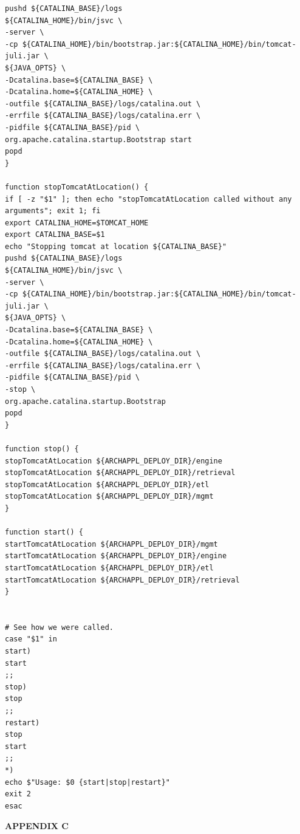 \documentclass[11pt
  , a4paper
  , article
  , oneside
]{memoir}
\begin{document}
\begin{lstlisting}[style=termstyle]
pushd ${CATALINA_BASE}/logs
${CATALINA_HOME}/bin/jsvc \
-server \
-cp ${CATALINA_HOME}/bin/bootstrap.jar:${CATALINA_HOME}/bin/tomcat-juli.jar \
${JAVA_OPTS} \
-Dcatalina.base=${CATALINA_BASE} \
-Dcatalina.home=${CATALINA_HOME} \
-outfile ${CATALINA_BASE}/logs/catalina.out \
-errfile ${CATALINA_BASE}/logs/catalina.err \
-pidfile ${CATALINA_BASE}/pid \
org.apache.catalina.startup.Bootstrap start
popd
}

function stopTomcatAtLocation() { 
if [ -z "$1" ]; then echo "stopTomcatAtLocation called without any arguments"; exit 1; fi
export CATALINA_HOME=$TOMCAT_HOME
export CATALINA_BASE=$1
echo "Stopping tomcat at location ${CATALINA_BASE}"
pushd ${CATALINA_BASE}/logs
${CATALINA_HOME}/bin/jsvc \
-server \
-cp ${CATALINA_HOME}/bin/bootstrap.jar:${CATALINA_HOME}/bin/tomcat-juli.jar \
${JAVA_OPTS} \
-Dcatalina.base=${CATALINA_BASE} \
-Dcatalina.home=${CATALINA_HOME} \
-outfile ${CATALINA_BASE}/logs/catalina.out \
-errfile ${CATALINA_BASE}/logs/catalina.err \
-pidfile ${CATALINA_BASE}/pid \
-stop \
org.apache.catalina.startup.Bootstrap 
popd
}

function stop() { 
stopTomcatAtLocation ${ARCHAPPL_DEPLOY_DIR}/engine
stopTomcatAtLocation ${ARCHAPPL_DEPLOY_DIR}/retrieval
stopTomcatAtLocation ${ARCHAPPL_DEPLOY_DIR}/etl
stopTomcatAtLocation ${ARCHAPPL_DEPLOY_DIR}/mgmt
}

function start() { 
startTomcatAtLocation ${ARCHAPPL_DEPLOY_DIR}/mgmt
startTomcatAtLocation ${ARCHAPPL_DEPLOY_DIR}/engine
startTomcatAtLocation ${ARCHAPPL_DEPLOY_DIR}/etl
startTomcatAtLocation ${ARCHAPPL_DEPLOY_DIR}/retrieval
}


# See how we were called.
case "$1" in
start)
start
;;
stop)
stop
;;
restart)
stop
start
;;
*)
echo $"Usage: $0 {start|stop|restart}"
exit 2
esac
\end{lstlisting}
\begin{center}
\label{appx:c}\LARGE\textbf{APPENDIX C}
\end{center}
\end{document}
